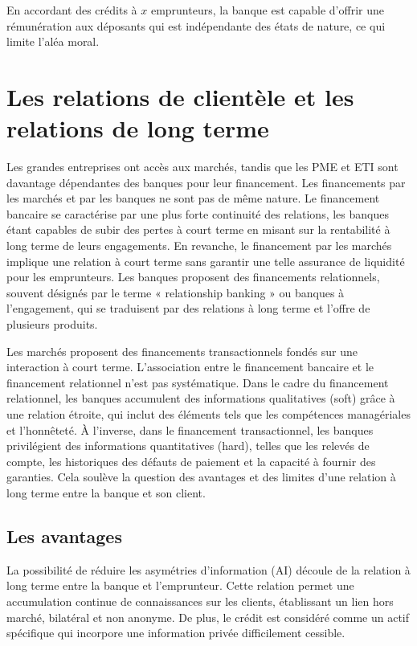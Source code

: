 \documentclass[a4paper, 12pt]{report}
\begin{document}
En accordant des crédits à \( x \) emprunteurs, la banque est capable d’offrir une rémunération aux déposants qui est indépendante des états de nature, ce qui limite l’aléa moral.

\section{Les relations de clientèle et les relations de long terme}

Les grandes entreprises ont accès aux marchés, tandis que les PME et ETI sont davantage dépendantes des banques pour leur financement. Les financements par les marchés et par les banques ne sont pas de même nature. Le financement bancaire se caractérise par une plus forte continuité des relations, les banques étant capables de subir des pertes à court terme en misant sur la rentabilité à long terme de leurs engagements. En revanche, le financement par les marchés implique une relation à court terme sans garantir une telle assurance de liquidité pour les emprunteurs. Les banques proposent des financements relationnels, souvent désignés par le terme « relationship banking » ou banques à l’engagement, qui se traduisent par des relations à long terme et l’offre de plusieurs produits.

Les marchés proposent des financements transactionnels fondés sur une interaction à court terme. L'association entre le financement bancaire et le financement relationnel n'est pas systématique. Dans le cadre du financement relationnel, les banques accumulent des informations qualitatives (soft) grâce à une relation étroite, qui inclut des éléments tels que les compétences managériales et l'honnêteté. À l'inverse, dans le financement transactionnel, les banques privilégient des informations quantitatives (hard), telles que les relevés de compte, les historiques des défauts de paiement et la capacité à fournir des garanties. Cela soulève la question des avantages et des limites d'une relation à long terme entre la banque et son client.

\subsection{Les avantages}

La possibilité de réduire les asymétries d'information (AI) découle de la relation à long terme entre la banque et l'emprunteur. Cette relation permet une accumulation continue de connaissances sur les clients, établissant un lien hors marché, bilatéral et non anonyme. De plus, le crédit est considéré comme un actif spécifique qui incorpore une information privée difficilement cessible.
\end{document}
